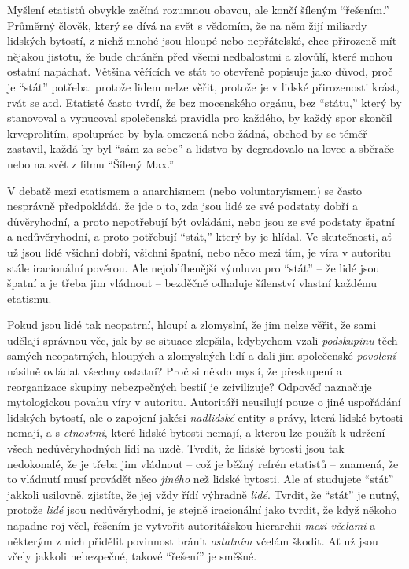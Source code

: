 \documentclass{book}
\begin{document}
Myšlení etatistů obvykle začíná rozumnou obavou, ale končí šíleným \enquote{řešením.} Průměrný člověk, který se dívá na svět s vědomím, že na něm žijí miliardy lidských bytostí, z nichž mnohé jsou hloupé nebo nepřátelské, chce přirozeně mít nějakou jistotu, že bude chráněn před všemi nedbalostmi a zlovůlí, které mohou ostatní napáchat. Většina věřících ve stát to otevřeně popisuje jako důvod, proč je \enquote{stát} potřeba: protože lidem nelze věřit, protože je v lidské přirozenosti krást, rvát se atd. Etatisté často tvrdí, že bez mocenského orgánu, bez \enquote{státu,} který by stanovoval a vynucoval společenská pravidla pro každého, by každý spor skončil krveprolitím, spolupráce by byla omezená nebo žádná, obchod by se téměř zastavil, každá by byl \enquote{sám za sebe} a lidstvo by degradovalo na lovce a sběrače nebo na svět z filmu \enquote{Šílený Max.}

V debatě mezi etatismem a anarchismem (nebo voluntaryismem) se často nesprávně předpokládá, že jde o to, zda jsou lidé ze své podstaty dobří a důvěryhodní, a proto nepotřebují být ovládáni, nebo jsou ze své podstaty špatní a nedůvěryhodní, a proto potřebují \enquote{stát,} který by je hlídal. Ve skutečnosti, ať už jsou lidé všichni dobří, všichni špatní, nebo něco mezi tím, je víra v autoritu stále iracionální pověrou. Ale nejoblíbenější výmluva pro \enquote{stát} -- že lidé jsou špatní a je třeba jim vládnout -- bezděčně odhaluje šílenství vlastní každému etatismu.

Pokud jsou lidé tak neopatrní, hloupí a zlomyslní, že jim nelze věřit, že sami udělají správnou věc, jak by se situace zlepšila, kdybychom vzali \emph{podskupinu} těch samých neopatrných, hloupých a zlomyslných lidí a dali jim společenské \emph{povolení} násilně ovládat všechny ostatní? Proč si někdo myslí, že přeskupení a reorganizace skupiny nebezpečných bestií je zcivilizuje? Odpověď naznačuje mytologickou povahu víry v autoritu. Autoritáři neusilují pouze o jiné uspořádání lidských bytostí, ale o zapojení jakési \emph{nadlidské} entity s právy, která lidské bytosti nemají, a s \emph{ctnostmi}, které lidské bytosti nemají, a kterou lze použít k udržení všech nedůvěryhodných lidí na uzdě. Tvrdit, že lidské bytosti jsou tak nedokonalé, že je třeba jim vládnout -- což je běžný refrén etatistů -- znamená, že to vládnutí musí provádět něco \emph{jiného} než lidské bytosti. Ale ať studujete \enquote{stát} jakkoli usilovně, zjistíte, že jej vždy řídí výhradně \emph{lidé}. Tvrdit, že \enquote{stát} je nutný, protože \emph{lidé} jsou nedůvěryhodní, je stejně iracionální jako tvrdit, že když někoho napadne roj včel, řešením je vytvořit autoritářskou hierarchii \emph{mezi včelami} a některým z nich přidělit povinnost bránit \emph{ostatním} včelám škodit. Ať už jsou včely jakkoli nebezpečné, takové \enquote{řešení} je směšné.
\end{document}
